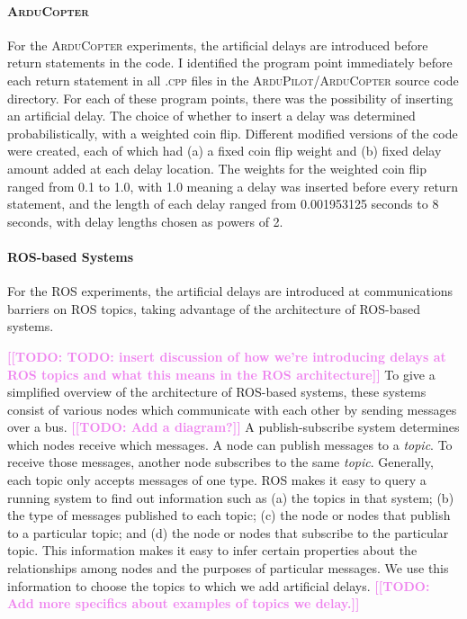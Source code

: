 \documentclass[conference]{IEEEtran}
\newcommand{\todo}[1]{\textcolor{violet}{{\bfseries [[TODO: #1]]}}}
\newcommand{\tool}[1]{\textsc{#1}}
\begin{document}
\paragraph{\tool{ArduCopter}} 
For the \tool{ArduCopter} experiments, the artificial delays are introduced before return statements in the code.
I identified the program point immediately before 
each return statement in all \tool{.cpp} files in the 
\tool{ArduPilot/ArduCopter} source code directory.
For each of these program points, there was the possibility of inserting an 
artificial delay.
The choice of whether to insert a delay was determined probabilistically, with a weighted coin flip. 
Different modified versions of the code were created, each of which had 
(a) a fixed coin flip weight and 
(b) fixed delay amount added at each delay location. 
The weights for the weighted coin flip ranged from 0.1 to 1.0, with 1.0
meaning a delay was inserted before every return statement, 
and the length of each delay ranged from 0.001953125 seconds to 8 seconds, 
with delay lengths chosen as powers of 2.

\paragraph{\tool{ROS}-based Systems}
For the \tool{\ac{ROS}} experiments, the artificial delays are introduced at communications 
barriers on ROS topics, taking advantage of the architecture of \tool{ROS}-based systems. 


\todo{TODO: insert discussion of how we're introducing delays at ROS topics and what this means in the ROS architecture}
To give a simplified overview of the architecture of ROS-based systems,
these systems consist of various nodes which communicate with each other by 
sending messages over a bus.
\todo{Add a diagram?} 
A publish-subscribe system determines which nodes receive which messages. 
A node can publish messages to a \emph{topic}.
To receive those messages, another node subscribes to the same \emph{topic}.
Generally, each topic only accepts messages of one type.
\tool{\ac{ROS}} makes it easy to query a running system to find out information
such as (a) the topics in that system; (b) the type of messages published to each
topic; (c) the node or nodes that publish to a particular topic; and (d) the node
or nodes that subscribe to the particular topic.
This information makes it easy to infer certain properties about the relationships
among nodes and the purposes of particular messages.
We use this information to choose the topics to which we add artificial delays.
\todo{Add more specifics about examples of topics we delay.}
\end{document}
